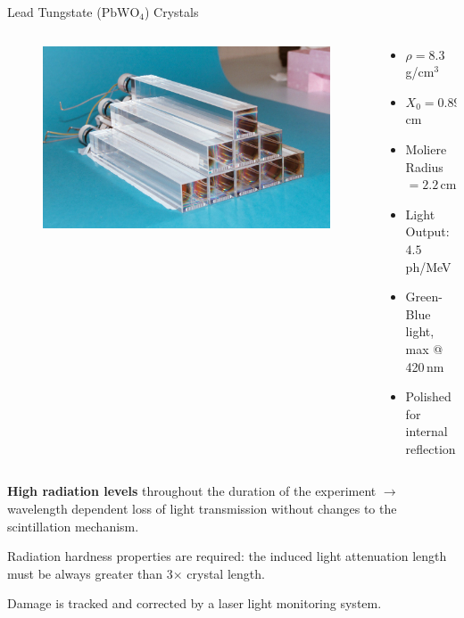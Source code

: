 \documentclass[10pt]{beamer}
\begin{document}
\begin{frame}{Lead Tungstate ($\text{PbWO}_4$) Crystals}
    \begin{columns}
        \begin{column}[l]{0.40\textwidth}
            \begin{figure}
                \includegraphics[width=\textwidth]{./img/crystals.jpg}
            \end{figure}    
        \end{column}
        \begin{column}[l]{0.55\textwidth}
            \begin{itemize}
                \item $\rho = 8.3\,$g/cm$^3$
                \item $X_0 = 0.89\,$cm
                \item Moliere Radius $ = 2.2$\,cm
                \item Light Output: $4.5$ ph/MeV
                \item Green-Blue light, max @ 420\,nm
                \item Polished for internal reflection
            \end{itemize}
        \end{column}
    \end{columns}
    \bigskip
    \textbf{High radiation levels} throughout the duration of the experiment $\rightarrow$ wavelength dependent loss of light transmission without changes to the scintillation mechanism.
    
    Radiation hardness properties are required: the induced light attenuation length must be always greater than 3$\times$ crystal length. 
    
    Damage is tracked and corrected by a laser light monitoring system.
\end{frame}
\end{document}
